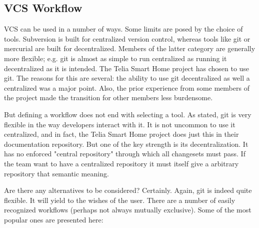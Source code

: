 \documentclass{article}
\begin{document}
\subsection{VCS Workflow}

VCS can be used in a number of ways. Some limits are posed by the choice
of tools. Subversion is built for centralized version control, whereas
tools like git or mercurial are built for decentralized. Members of the 
latter category are generally more flexible; e.g. git is almost as simple 
to run centralized as running it decentralized as it is intended. The 
Telia Smart Home project has chosen to use git. The reasons for this are
several: the ability to use git decentralized as well a centralized was a
major point. Also, the prior experience from some members of the project
made the transition for other members less burdensome.

But defining a workflow does not end with selecting a tool. As stated, 
git is very flexible in the way developers interact with it. It is not
uncommon to use it centralized, and in fact, the Telia Smart Home project
does just this in their documentation repository. But one of the key 
strength is its decentralization. It has no enforced "central repository"
through which all changesets must pass. If the team want to have a 
centralized repository it must itself give a arbitrary repository that
semantic meaning.

Are there any alternatives to be considered? Certainly. Again, git is 
indeed quite flexible. It will yield to the wishes of the user. There are 
a number of easily recognized workflows (perhaps not always mutually
exclusive). Some of the most popular ones are presented here:
\end{document}

